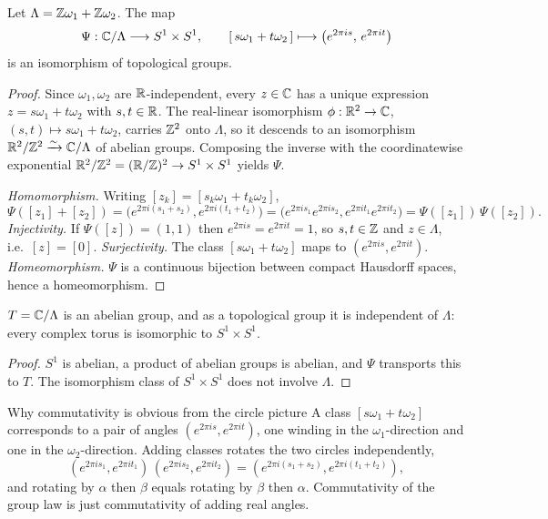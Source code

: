 \begin{proposition}
\label{prop:tg-s1xs1}
Let \(\Lambda = \mathbb{Z}\omega_1 + \mathbb{Z}\omega_2\). The map
\[
  \Psi : \mathbb{C}/\Lambda \longrightarrow S^1 \times S^1,
  \qquad
  [\,s\omega_1 + t\omega_2\,] \longmapsto \bigl( e^{2\pi i s},\, e^{2\pi i t} \bigr)
\]
is an isomorphism of topological groups.
\end{proposition}

\begin{proof}
Since \(\omega_1, \omega_2\) are \(\mathbb{R}\)-independent, every \(z \in \mathbb{C}\) has a
unique expression \(z = s\omega_1 + t\omega_2\) with \(s, t \in \mathbb{R}\). The
real-linear isomorphism \(\phi : \mathbb{R}^2 \to \mathbb{C}\), \((s,t) \mapsto s\omega_1 +
t\omega_2\), carries \(\mathbb{Z}^2\) onto \(\Lambda\), so it descends to an isomorphism
\(\mathbb{R}^2/\mathbb{Z}^2 \xrightarrow{\sim} \mathbb{C}/\Lambda\) of abelian groups. Composing the
inverse with the coordinatewise exponential
\(\mathbb{R}^2/\mathbb{Z}^2 = (\mathbb{R}/\mathbb{Z})^2 \to S^1 \times S^1\) yields \(\Psi\).

\emph{Homomorphism.} Writing \([z_k] = [s_k\omega_1 + t_k\omega_2]\),
\[
  \Psi([z_1]+[z_2])
  = \bigl( e^{2\pi i(s_1+s_2)}, e^{2\pi i(t_1+t_2)} \bigr)
  = \bigl( e^{2\pi i s_1} e^{2\pi i s_2}, e^{2\pi i t_1} e^{2\pi i t_2} \bigr)
  = \Psi([z_1])\,\Psi([z_2]).
\]
\emph{Injectivity.} If \(\Psi([z]) = (1,1)\) then \(e^{2\pi i s} = e^{2\pi i t}
= 1\), so \(s, t \in \mathbb{Z}\) and \(z \in \Lambda\), i.e.\ \([z] = [0]\).
\emph{Surjectivity.} The class \([s\omega_1 + t\omega_2]\) maps to
\((e^{2\pi i s}, e^{2\pi i t})\). \emph{Homeomorphism.} \(\Psi\) is a continuous
bijection between compact Hausdorff spaces, hence a homeomorphism.
\end{proof}

\begin{corollary}
\label{cor:tg-abelian}
\(T = \mathbb{C}/\Lambda\) is an abelian group, and as a topological group it is
independent of \(\Lambda\): every complex torus is isomorphic to
\(S^1 \times S^1\).
\end{corollary}

\begin{proof}
\(S^1\) is abelian, a product of abelian groups is abelian, and \(\Psi\)
transports this to \(T\). The isomorphism class of \(S^1 \times S^1\) does not
involve \(\Lambda\).
\end{proof}

\begin{keyidea}{Why commutativity is obvious from the circle picture}
A class \([s\omega_1 + t\omega_2]\) corresponds to a pair of angles
\((e^{2\pi i s}, e^{2\pi i t})\), one winding in the \(\omega_1\)-direction and
one in the \(\omega_2\)-direction. Adding classes rotates the two circles
independently,
\[
  (e^{2\pi i s_1}, e^{2\pi i t_1})\,(e^{2\pi i s_2}, e^{2\pi i t_2})
  = (e^{2\pi i(s_1+s_2)}, e^{2\pi i(t_1+t_2)}),
\]
and rotating by \(\alpha\) then \(\beta\) equals rotating by \(\beta\) then
\(\alpha\). Commutativity of the group law is just commutativity of adding real
angles.
\end{keyidea}

